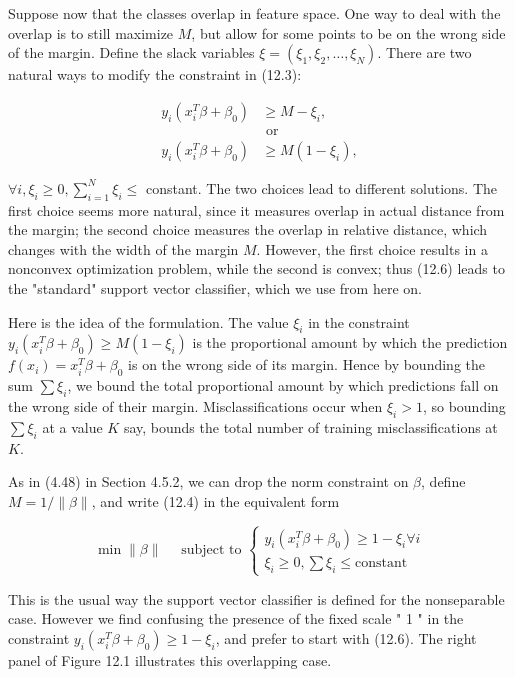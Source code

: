 \documentclass[10pt]{article}
\begin{document}
Suppose now that the classes overlap in feature space. One way to deal with the overlap is to still maximize $M$, but allow for some points to be on the wrong side of the margin. Define the slack variables $\xi=\left(\xi_{1}, \xi_{2}, \ldots, \xi_{N}\right)$. There are two natural ways to modify the constraint in (12.3):


\begin{align*}
y_{i}\left(x_{i}^{T} \beta+\beta_{0}\right) & \geq M-\xi_{i},  \tag{12.5}\\
& \text { or } \\
y_{i}\left(x_{i}^{T} \beta+\beta_{0}\right) & \geq M\left(1-\xi_{i}\right), \tag{12.6}
\end{align*}


$\forall i, \xi_{i} \geq 0, \sum_{i=1}^{N} \xi_{i} \leq$ constant. The two choices lead to different solutions. The first choice seems more natural, since it measures overlap in actual distance from the margin; the second choice measures the overlap in relative distance, which changes with the width of the margin $M$. However, the first choice results in a nonconvex optimization problem, while the second is convex; thus (12.6) leads to the "standard" support vector classifier, which we use from here on.

Here is the idea of the formulation. The value $\xi_{i}$ in the constraint $y_{i}\left(x_{i}^{T} \beta+\right. \left.\beta_{0}\right) \geq M\left(1-\xi_{i}\right)$ is the proportional amount by which the prediction $f\left(x_{i}\right)=x_{i}^{T} \beta+\beta_{0}$ is on the wrong side of its margin. Hence by bounding the sum $\sum \xi_{i}$, we bound the total proportional amount by which predictions fall on the wrong side of their margin. Misclassifications occur when $\xi_{i}>1$, so bounding $\sum \xi_{i}$ at a value $K$ say, bounds the total number of training misclassifications at $K$.

As in (4.48) in Section 4.5.2, we can drop the norm constraint on $\beta$, define $M=1 /\|\beta\|$, and write (12.4) in the equivalent form

\[
\min \|\beta\| \quad \text { subject to }\left\{\begin{array}{l}
y_{i}\left(x_{i}^{T} \beta+\beta_{0}\right) \geq 1-\xi_{i} \forall i  \tag{12.7}\\
\xi_{i} \geq 0, \sum \xi_{i} \leq \mathrm{constant}
\end{array}\right.
\]

This is the usual way the support vector classifier is defined for the nonseparable case. However we find confusing the presence of the fixed scale " 1 " in the constraint $y_{i}\left(x_{i}^{T} \beta+\beta_{0}\right) \geq 1-\xi_{i}$, and prefer to start with (12.6). The right panel of Figure 12.1 illustrates this overlapping case.
\end{document}
